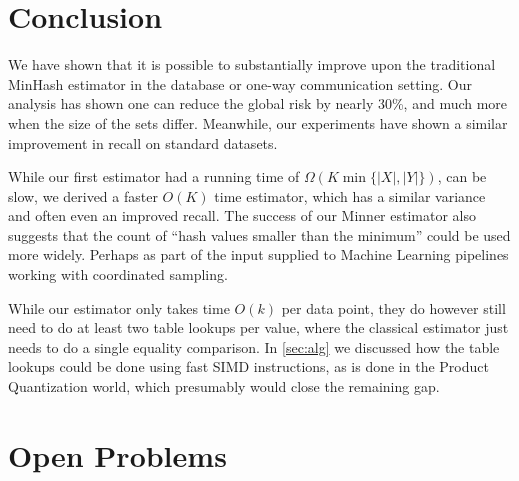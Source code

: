 
\section{Conclusion}

We have shown that it is possible to substantially improve upon the traditional MinHash estimator in the database or one-way communication setting.
Our analysis has shown one can reduce the global risk by nearly 30\%,
and much more when the size of the sets differ.
Meanwhile, our experiments have shown a similar improvement in recall on standard datasets.

While our first estimator had a running time of $\Omega(K \min\{|X|,|Y|\})$, can be slow, we derived a faster $O(K)$ time estimator, which has a similar variance and often even an improved recall.
The success of our Minner estimator also suggests that the count of ``hash values smaller than the minimum'' could be used more widely.
Perhaps as part of the input supplied to Machine Learning pipelines working with coordinated sampling.


While our estimator only takes time $O(k)$ per data point, they do however still need to do at least two table lookups per value, where the classical estimator just needs to do a single equality comparison.
In \cref{sec:alg} we discussed how the table lookups could be done using fast SIMD instructions, as is done in the Product Quantization world, which presumably would close the remaining gap.

\section{Open Problems}

